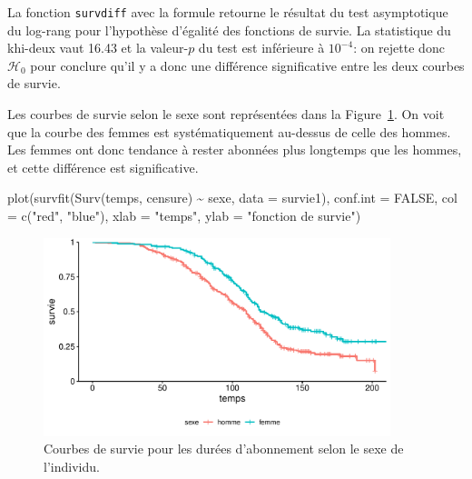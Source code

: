 \documentclass[
  11pt,
  letterpaper,
]{scrbook}
\newenvironment{Shaded}{\begin{snugshade}}{\end{snugshade}}
\newcommand{\AttributeTok}[1]{\textcolor[rgb]{0.40,0.45,0.13}{#1}}
\newcommand{\ConstantTok}[1]{\textcolor[rgb]{0.56,0.35,0.01}{#1}}
\newcommand{\FunctionTok}[1]{\textcolor[rgb]{0.28,0.35,0.67}{#1}}
\newcommand{\NormalTok}[1]{\textcolor[rgb]{0.00,0.23,0.31}{#1}}
\newcommand{\SpecialCharTok}[1]{\textcolor[rgb]{0.37,0.37,0.37}{#1}}
\newcommand{\StringTok}[1]{\textcolor[rgb]{0.13,0.47,0.30}{#1}}
\theoremstyle{definition}
\theoremstyle{remark}
\begin{document}
La fonction \texttt{survdiff} avec la formule retourne le résultat du
test asymptotique du log-rang pour l'hypothèse d'égalité des fonctions
de survie. La statistique du khi-deux vaut 16.43 et la valeur-\(p\) du
test est inférieure à \(10^{-4}\): on rejette donc \(\mathscr{H}_0\)
pour conclure qu'il y a donc une différence significative entre les deux
courbes de survie.

Les courbes de survie selon le sexe sont représentées dans la
Figure~\ref{fig-survie-comparaison-courbes}. On voit que la courbe des
femmes est systématiquement au-dessus de celle des hommes. Les femmes
ont donc tendance à rester abonnées plus longtemps que les hommes, et
cette différence est significative.

\begin{Shaded}
\begin{Highlighting}[]
\FunctionTok{plot}\NormalTok{(}\FunctionTok{survfit}\NormalTok{(}\FunctionTok{Surv}\NormalTok{(temps, censure) }\SpecialCharTok{\textasciitilde{}}\NormalTok{ sexe, }
             \AttributeTok{data =}\NormalTok{ survie1), }
     \AttributeTok{conf.int =} \ConstantTok{FALSE}\NormalTok{,}
     \AttributeTok{col =} \FunctionTok{c}\NormalTok{(}\StringTok{"red"}\NormalTok{, }\StringTok{"blue"}\NormalTok{), }
     \AttributeTok{xlab =} \StringTok{"temps"}\NormalTok{, }
     \AttributeTok{ylab =} \StringTok{"fonction de survie"}\NormalTok{)}
\end{Highlighting}
\end{Shaded}

\begin{figure}[ht!]

{\centering \includegraphics[width=0.9\textwidth,height=\textheight]{survie_files/figure-pdf/fig-survie-comparaison-courbes-1.pdf}

}

\caption{\label{fig-survie-comparaison-courbes}Courbes de survie pour
les durées d'abonnement selon le sexe de l'individu.}

\end{figure}
\end{document}
